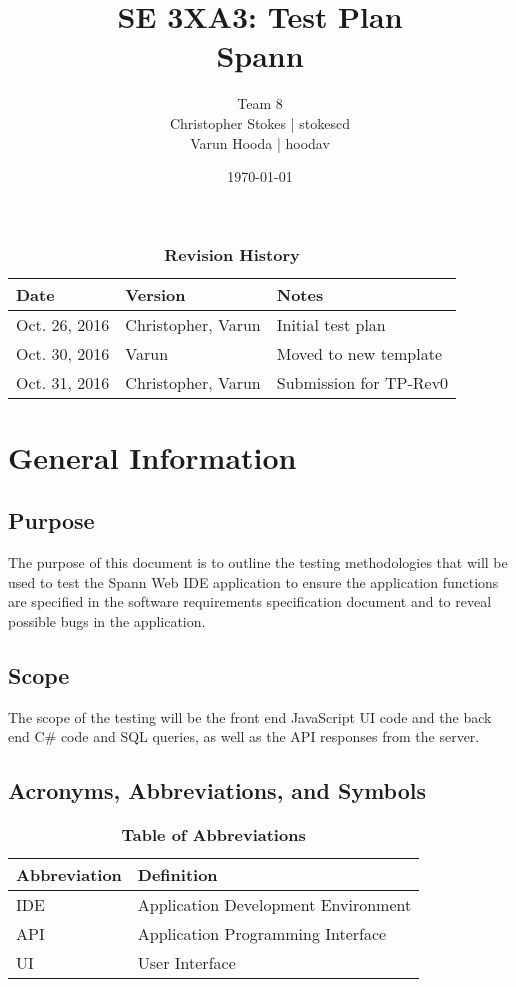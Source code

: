 \documentclass[12pt, titlepage]{article}
\title{SE 3XA3: Test Plan\\Spann}
\author{Team 8
		\\ Christopher Stokes | stokescd
		\\ Varun Hooda | hoodav
}
\date{\today}
\begin{document}
\maketitle

\tableofcontents
\listoftables

\begin{table}[bp]
\caption{\bf Revision History}
\begin{tabularx}{\textwidth}{p{3cm}p{2cm}X}
\toprule {\bf Date} & {\bf Version} & {\bf Notes}\\
\midrule
    Oct. 26, 2016 & Christopher, Varun & Initial test plan\\
    Oct. 30, 2016 & Varun & Moved to new template\\
    Oct. 31, 2016 & Christopher, Varun & Submission for TP-Rev0\\
\bottomrule
\end{tabularx}
\end{table}

\newpage


\section{General Information}

\subsection{Purpose}
The purpose of this document is to outline the testing methodologies that will
be used to test the Spann Web IDE application to ensure the application
functions are specified in the software requirements specification document and
to reveal possible bugs in the application.

\subsection{Scope}
The scope of the testing will be the front end JavaScript UI code and the back
end C\# code and SQL queries, as well as the API responses from the server.

\subsection{Acronyms, Abbreviations, and Symbols}
	
\begin{table}[hbp]
\caption{\textbf{Table of Abbreviations}} \label{Table}

\begin{tabularx}{\textwidth}{p{3cm}X}
\toprule
\textbf{Abbreviation} & \textbf{Definition} \\
\midrule
IDE & Application Development Environment\\
API & Application Programming Interface\\
UI & User Interface\\
\bottomrule
\end{tabularx}

\end{table}
\end{document}
